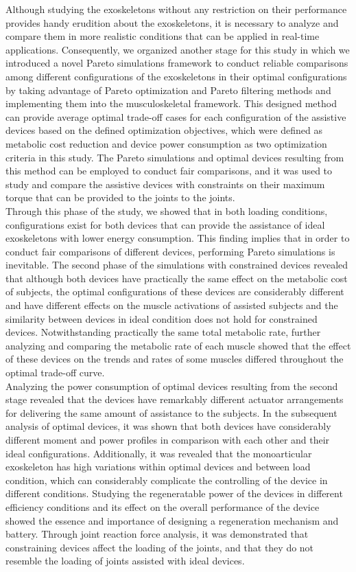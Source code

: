 \documentclass[10pt,letterpaper]{article}
\begin{document}
Although studying the exoskeletons without any restriction on their performance provides handy erudition about the exoskeletons, it is necessary to analyze and compare them in more realistic conditions that can be applied in real-time applications. Consequently, we organized another stage for this study in which we introduced a novel Pareto simulations framework to conduct reliable comparisons among different configurations of the exoskeletons in their optimal configurations by taking advantage of Pareto optimization and Pareto filtering methods and implementing them into the musculoskeletal framework. This designed method can provide average optimal trade-off cases for each configuration of the assistive devices based on the defined optimization objectives, which were defined as metabolic cost reduction and device power consumption as two optimization criteria in this study. The Pareto simulations and optimal devices resulting from this method can be employed to conduct fair comparisons, and it was used to study and compare the assistive devices with constraints on their maximum torque that can be provided to the joints to the joints.\\
Through this phase of the study, we showed that in both loading conditions, configurations exist for both devices that can provide the assistance of ideal exoskeletons with lower energy consumption. This finding implies that in order to conduct fair comparisons of different devices, performing Pareto simulations is inevitable. The second phase of the simulations with constrained devices revealed that although both devices have practically the same effect on the metabolic cost of subjects, the optimal configurations of these devices are considerably different and have different effects on the muscle activations of assisted subjects and the similarity between devices in ideal condition does not hold for constrained devices. Notwithstanding practically the same total metabolic rate, further analyzing and comparing the metabolic rate of each muscle showed that the effect of these devices on the trends and rates of some muscles differed throughout the optimal trade-off curve.\\
Analyzing the power consumption of optimal devices resulting from the second stage revealed that the devices have remarkably different actuator arrangements for delivering the same amount of assistance to the subjects. In the subsequent analysis of optimal devices, it was shown that both devices have considerably different moment and power profiles in comparison with each other and their ideal configurations. Additionally, it was revealed that the monoarticular exoskeleton has high variations within optimal devices and between load condition, which can considerably complicate the controlling of the device in different conditions. Studying the regeneratable power of the devices in different efficiency conditions and its effect on the overall performance of the device showed the essence and importance of designing a regeneration mechanism and battery. Through joint reaction force analysis, it was demonstrated that constraining devices affect the loading of the joints, and that they do not resemble the loading of joints assisted with ideal devices.\\
\end{document}
